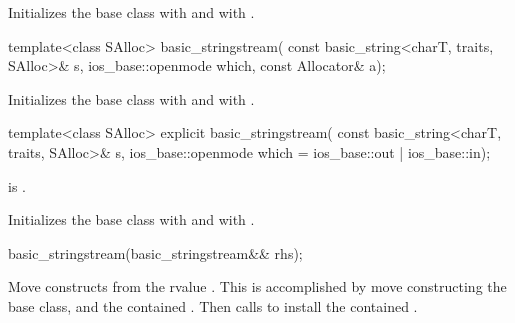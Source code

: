 \begin{itemdescr}
\pnum
\effects
Initializes the base class with
and  with
.
\end{itemdescr}

%
\begin{itemdecl}
template<class SAlloc>
  basic_stringstream(
    const basic_string<charT, traits, SAlloc>& s,
    ios_base::openmode which, const Allocator& a);
\end{itemdecl}

\begin{itemdescr}
\pnum
\effects
Initializes the base class with
and  with
.
\end{itemdescr}

%
\begin{itemdecl}
template<class SAlloc>
  explicit basic_stringstream(
    const basic_string<charT, traits, SAlloc>& s,
    ios_base::openmode which = ios_base::out | ios_base::in);
\end{itemdecl}

\begin{itemdescr}
\pnum
\constraints
{} is .

\pnum
\effects
Initializes the base class with
and  with
.
\end{itemdescr}

%
\begin{itemdecl}
basic_stringstream(basic_stringstream&& rhs);
\end{itemdecl}

\begin{itemdescr}
\pnum
\effects
Move constructs from the rvalue . This
is accomplished by move constructing the base class, and the contained
.
Then calls 
to install the contained .
\end{itemdescr}

